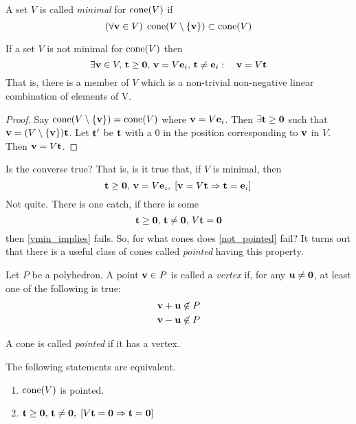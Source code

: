 \begin{Def}
	A set $V$ is called \textit{minimal} for $\operatorname{cone}(V)$ if
	\[ (\forall \mathbf{v} \in V)\; \operatorname{cone}(V\setminus\{\mathbf{v}\}) \subset \operatorname{cone}(V) \]
\end{Def}

\begin{Prop}\label{v_not_minimal}
	If a set $V$ is not minimal for $\operatorname{cone}(V)$ then
	\[\exists \mathbf{v}\in V,\, \mathbf{t}\geq\mathbf{0},\, \mathbf{v}=V\mathbf{e}_i,\,\mathbf{t}\neq\mathbf{e}_i:\quad \mathbf{v} = V\mathbf{t} \]
	That is, there is a member of $V$ which is a non-trivial non-negative linear combination of elements of V.
\end{Prop}

\begin{proof}
	Say $\operatorname{cone}(V\setminus\{\mathbf{v}\}) = \operatorname{cone}(V)$ where $\mathbf{v}=V\mathbf{e}_i$.  Then $\exists \mathbf{t}\geq\mathbf{0}$ such that $\mathbf{v}=(V\setminus\{\mathbf{v}\})\mathbf{t}$.  Let $\mathbf{t}'$ be $\mathbf{t}$ with a $0$ in the position corresponding to $\mathbf{v}$ in $V$.  Then $\mathbf{v}=V\mathbf{t}$.
\end{proof}

Is the converse true?  That is, is it true that, if $V$ is minimal, then
\begin{equation}
	\mathbf{t}\geq\mathbf{0},\,\mathbf{v}=V\mathbf{e}_i,\; [\mathbf{v}=V\mathbf{t} \Rightarrow \mathbf{t}=\mathbf{e}_i]\, \label{vmin_implies}
\end{equation}
Not quite.  There is one catch, if there is some
\begin{equation}
	\mathbf{t}\geq\mathbf{0},\,\mathbf{t}\neq\mathbf{0},\,V\mathbf{t}=\mathbf{0}  \label{not_pointed}
\end{equation}
then \eqref{vmin_implies} fails.  So, for what cones does \eqref{not_pointed} fail?  It turns out that there is a useful class of cones called \textit{pointed} having this property.

\begin{Def}[Vertex]
	Let $P$ be a polyhedron.  A point $\mathbf{v} \in P$ is called a \textit{vertex} if, for any $\mathbf{u} \neq \mathbf{0}$, at least one of the following is true:
	\begin{align*}
		\mathbf{v} + \mathbf{u} \not\in P \\
		\mathbf{v} - \mathbf{u} \not\in P
	\end{align*}
\end{Def}

\begin{Def}
	A cone is called \textit{pointed} if it has a vertex.
\end{Def}

\begin{Prop} \label{v_is_pointed} The following statements are equivalent.
	\begin{enumerate}
		\item $\operatorname{cone}(V)$ is pointed.
		\item $\mathbf{t}\geq\mathbf{0},\,\mathbf{t}\neq\mathbf{0},\; [V\mathbf{t}=\mathbf{0} \Rightarrow \mathbf{t}=\mathbf{0}]$
	\end{enumerate}
\end{Prop}

